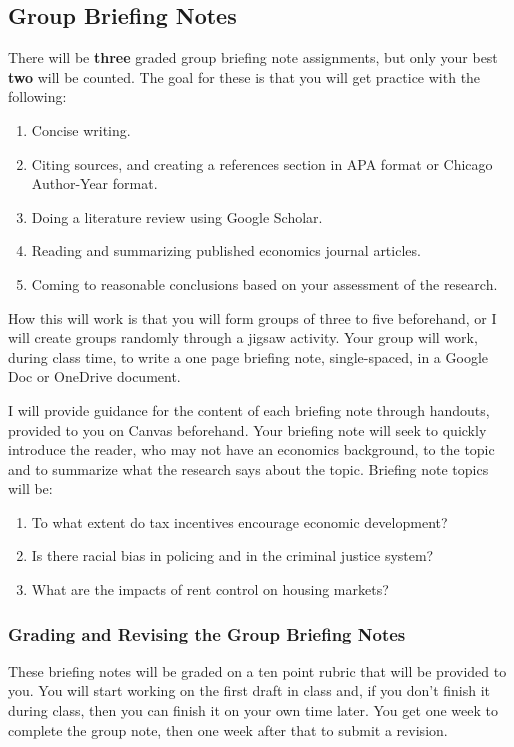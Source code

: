 \documentclass[11pt,letterpaper,final]{article}
\begin{document}
\subsection{Group Briefing Notes}
There will be \textbf{three} graded group briefing note assignments, but only your best \textbf{two} will be counted. The goal for these is that you will get practice with the following:
\begin{enumerate}
\item Concise writing.
\item Citing sources, and creating a references section in APA format or Chicago Author-Year format.
\item Doing a literature review using Google Scholar.
\item Reading and summarizing published economics journal articles.
\item Coming to reasonable conclusions based on your assessment of the research.
\end{enumerate}
How this will work is that you will form groups of three to five beforehand, or I will create groups randomly through a jigsaw activity. Your group will work, during class time, to write a one page briefing note, single-spaced, in a Google Doc or OneDrive document.

I will provide guidance for the content of each briefing note through handouts, provided to you on Canvas beforehand. Your briefing note will seek to quickly introduce the reader, who may not have an economics background, to the topic and to summarize what the research says about the topic. Briefing note topics will be:

\begin{enumerate}
\item To what extent do tax incentives encourage economic development?
\item Is there racial bias in policing and in the criminal justice system?
\item What are the impacts of rent control on housing markets?
\end{enumerate}

\subsubsection{Grading and Revising the Group Briefing Notes}
These briefing notes will be graded on a ten point rubric that will be provided to you. You will start working on the first draft in class and, if you don't finish it during class, then you can finish it on your own time later. You get one week to complete the group note, then one week after that to submit a revision.
\end{document}
